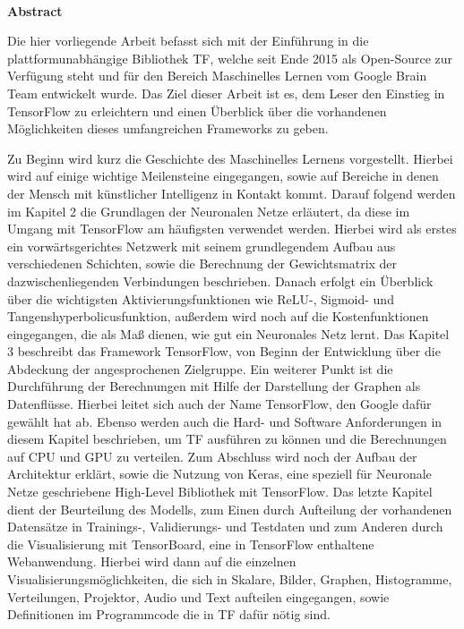 

\newpage{}

~

\vspace{17.1mm}


\noindent \begin{flushleft}
\textbf{\huge{}Abstract}
\par\end{flushleft}{\huge \par}

Die hier vorliegende Arbeit befasst sich mit der Einführung in die plattformunabhängige Bibliothek \gls{TF}, welche seit Ende 2015 als Open-Source zur Verfügung steht und für den Bereich Maschinelles Lernen vom Google Brain Team entwickelt wurde. Das Ziel dieser Arbeit ist es, dem Leser den Einstieg in TensorFlow zu erleichtern und einen Überblick über die vorhandenen Möglichkeiten dieses umfangreichen Frameworks zu geben.

Zu Beginn wird kurz die Geschichte des Maschinelles Lernens vorgestellt. Hierbei wird auf einige wichtige Meilensteine eingegangen, sowie auf Bereiche in denen der Mensch mit künstlicher Intelligenz in Kontakt kommt. Darauf folgend werden im Kapitel 2  die Grundlagen der Neuronalen Netze erläutert, da diese im Umgang mit TensorFlow am häufigsten verwendet werden. Hierbei wird als erstes ein vorwärtsgerichtes Netzwerk mit seinem grundlegendem Aufbau aus verschiedenen Schichten, sowie die Berechnung der Gewichtsmatrix der dazwischenliegenden Verbindungen beschrieben. Danach erfolgt ein Überblick über die wichtigsten  Aktivierungsfunktionen wie ReLU-, Sigmoid- und Tangenshyperbolicusfunktion, außerdem wird noch auf die Kostenfunktionen eingegangen, die als Maß dienen, wie gut ein Neuronales Netz lernt. Das Kapitel 3 beschreibt das Framework TensorFlow, von Beginn der Entwicklung über die Abdeckung der angesprochenen Zielgruppe. Ein weiterer Punkt ist die  Durchführung der Berechnungen mit Hilfe der Darstellung der Graphen als Datenflüsse. Hierbei leitet sich auch der Name TensorFlow, den Google dafür gewählt hat ab. Ebenso werden auch die Hard- und Software Anforderungen in diesem Kapitel beschrieben, um TF ausführen zu können und die Berechnungen auf CPU und GPU zu verteilen. Zum Abschluss wird noch der Aufbau der Architektur erklärt, sowie die Nutzung von Keras, eine speziell für Neuronale Netze geschriebene High-Level Bibliothek mit TensorFlow. Das letzte Kapitel dient der Beurteilung des Modells, zum Einen durch Aufteilung der vorhandenen Datensätze in Trainings-, Validierungs- und Testdaten und zum Anderen durch die Visualisierung mit TensorBoard, eine in TensorFlow enthaltene Webanwendung. Hierbei wird dann auf die einzelnen Visualisierungsmöglichkeiten, die sich in Skalare, Bilder, Graphen, Histogramme, Verteilungen, Projektor, Audio und Text aufteilen eingegangen, sowie Definitionen im Programmcode die in TF dafür nötig sind.  
